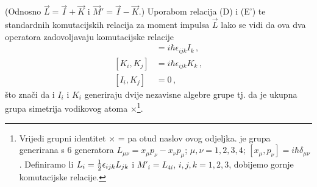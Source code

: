 (Odnosno $\vec{L} = \vec{I} + \vec{K}$ i
$\vec{M}' =  \vec{I} - \vec{K}$.)
Uporabom relacija (D) i (E') te standardnih komutacijskih
relacija za moment impulsa $\vec{L}$ lako se vidi da ova 
dva operatora zadovoljavaju komutacijske relacije
\begin{align}
[I_i, I_j] &= i \hbar \epsilon_{ijk}  I_k \,, \\
[K_i, K_j] &= i \hbar \epsilon_{ijk}  K_k \,,\\
[I_i, K_j] &= 0 \,,
\end{align}
što znači da i $I_i$ i $K_i$ generiraju dvije nezavisne
algebre grupe  tj. da je ukupna grupa simetrija vodikovog
atoma $\times$\footnote{Vrijedi grupni identitet
$\times$ =  pa otud naslov ovog odjeljka. 
 je grupa generirana s 6
generatora $L_{\mu\nu}=x_\mu p_\nu - x_\nu p_\mu$; $\mu, \nu = 1,2,3,4$;
$[x_\mu, p_\nu] = i\hbar \delta_{\mu\nu}$. Definiramo li
$L_i = \frac{1}{2} \epsilon_{ijk} L_{jk}$ i $M'_i = L_{4i}$, $i,j,k = 1,2,3$,
dobijemo gornje komutacijske relacije.}.


